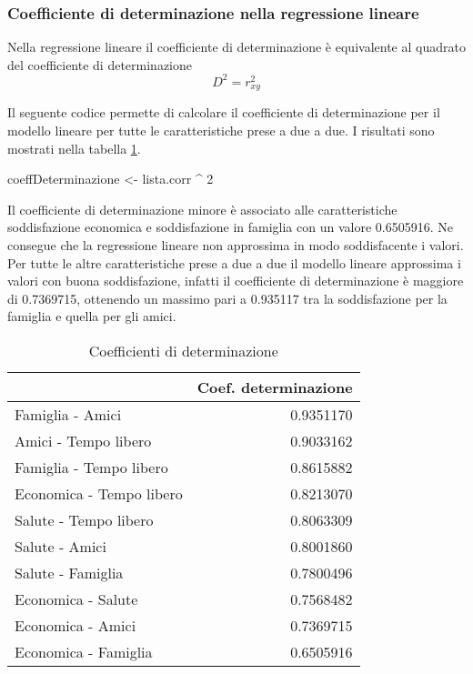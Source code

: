 \documentclass[]{book}
\newenvironment{Shaded}{\begin{snugshade}}{\end{snugshade}}
\newcommand{\DecValTok}[1]{\textcolor[rgb]{0.00,0.00,0.81}{#1}}
\newcommand{\StringTok}[1]{\textcolor[rgb]{0.31,0.60,0.02}{#1}}
\newcommand{\OperatorTok}[1]{\textcolor[rgb]{0.81,0.36,0.00}{\textbf{#1}}}
\newcommand{\NormalTok}[1]{#1}
\begin{document}
\subsubsection{Coefficiente di determinazione nella regressione
lineare}\label{coefficiente-di-determinazione-nella-regressione-lineare}

Nella regressione lineare il coefficiente di determinazione è
equivalente al quadrato del coefficiente di determinazione
\[D^2=r_{xy}^2\]

Il seguente codice permette di calcolare il coefficiente di
determinazione per il modello lineare per tutte le caratteristiche prese
a due a due. I risultati sono mostrati nella tabella
\ref{tab:coeff-determinazione}.

\begin{Shaded}
\begin{Highlighting}[]
\NormalTok{coeffDeterminazione <-}\StringTok{ }\NormalTok{lista.corr }\OperatorTok{^}\StringTok{ }\DecValTok{2}
\end{Highlighting}
\end{Shaded}

Il coefficiente di determinazione minore è associato alle
caratteristiche soddisfazione economica e soddisfazione in famiglia con
un valore 0.6505916. Ne consegue che la regressione lineare non
approssima in modo soddisfacente i valori. Per tutte le altre
caratteristiche prese a due a due il modello lineare approssima i valori
con buona soddisfazione, infatti il coefficiente di determinazione è
maggiore di 0.7369715, ottenendo un massimo pari a 0.935117 tra la
soddisfazione per la famiglia e quella per gli amici.

\begin{table}

\caption{\label{tab:coeff-determinazione}Coefficienti di determinazione}
\centering
\begin{tabular}[t]{l|r}
\hline
  & Coef. determinazione\\
\hline
Famiglia - Amici & 0.9351170\\
\hline
Amici - Tempo libero & 0.9033162\\
\hline
Famiglia - Tempo libero & 0.8615882\\
\hline
Economica - Tempo libero & 0.8213070\\
\hline
Salute - Tempo libero & 0.8063309\\
\hline
Salute - Amici & 0.8001860\\
\hline
Salute - Famiglia & 0.7800496\\
\hline
Economica - Salute & 0.7568482\\
\hline
Economica - Amici & 0.7369715\\
\hline
Economica - Famiglia & 0.6505916\\
\hline
\end{tabular}
\end{table}
\end{document}
